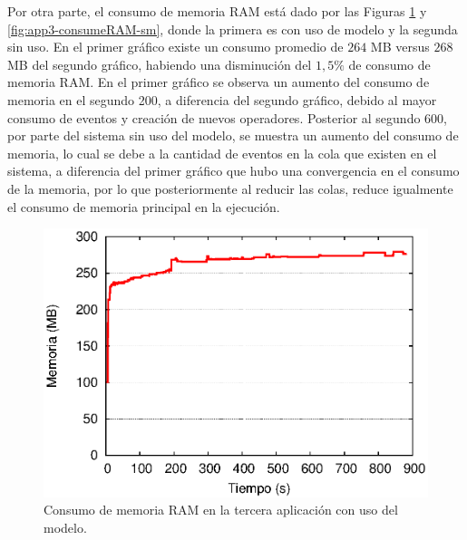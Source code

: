 Por otra parte, el consumo de memoria RAM está dado por las Figuras \ref{fig:app3-consumeRAM-cm} y \ref{fig:app3-consumeRAM-sm}, donde la primera es con uso de modelo y la segunda sin uso. En el primer gráfico existe un consumo promedio de $264$ MB versus $268$ MB del segundo gráfico, habiendo una disminución del $1,5\%$ de consumo de memoria RAM. En el primer gráfico se observa un aumento del consumo de memoria en el segundo 200, a diferencia del segundo gráfico, debido al mayor consumo de eventos y creación de nuevos operadores. Posterior al segundo 600, por parte del sistema sin uso del modelo, se muestra un aumento del consumo de memoria, lo cual se debe a la cantidad de eventos en la cola que existen en el sistema, a diferencia del primer gráfico que hubo una convergencia en el consumo de la memoria, por lo que posteriormente al reducir las colas, reduce igualmente el consumo de memoria principal en la ejecución.

\begin{figure}[!ht]
\centering
    \includegraphics[scale=0.75]{images/exp/app3/cm/fisical/consumeRAM.eps}
    \caption{Consumo de memoria RAM en la tercera aplicación con uso del modelo.}
    \label{fig:app3-consumeRAM-cm}
\end{figure}

